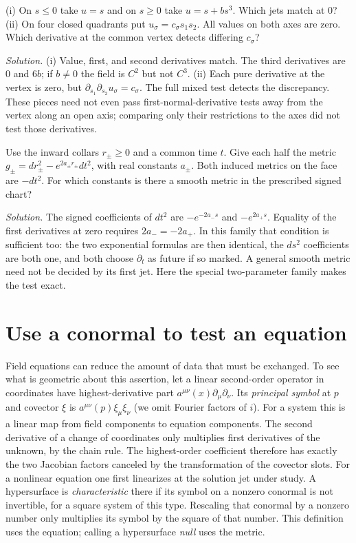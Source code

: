 \begin{exercise}
(i) On $s\leq0$ take $u=s$ and on $s\geq0$ take $u=s+bs^3$. Which jets match at $0$? (ii) On four closed quadrants put $u_\sigma=c_\sigma s_1s_2$. All values on both axes are zero. Which derivative at the common vertex detects differing $c_\sigma$?
\end{exercise}
\noindent\emph{Solution.} (i) Value, first, and second derivatives match. The third derivatives are $0$ and $6b$; if $b\ne0$ the field is $C^2$ but not $C^3$. (ii) Each pure derivative at the vertex is zero, but $\partial_{s_1}\partial_{s_2}u_\sigma=c_\sigma$. The full mixed test detects the discrepancy. These pieces need not even pass first-normal-derivative tests away from the vertex along an open axis; comparing only their restrictions to the axes did not test those derivatives.

\begin{exercise}
Use the inward collars $r_\pm\geq0$ and a common time $t$. Give each half the metric $g_\pm=dr_\pm^2-e^{2a_\pm r_\pm}dt^2$, with real constants $a_\pm$. Both induced metrics on the face are $-dt^2$. For which constants is there a smooth metric in the prescribed signed chart?
\end{exercise}
\noindent\emph{Solution.} The signed coefficients of $dt^2$ are $-e^{-2a_-s}$ and $-e^{2a_+s}$. Equality of the first derivatives at zero requires $2a_-=-2a_+$. In this family that condition is sufficient too: the two exponential formulas are then identical, the $ds^2$ coefficients are both one, and both choose $\partial_t$ as future if so marked. A general smooth metric need not be decided by its first jet. Here the special two-parameter family makes the test exact.

\section{Use a conormal to test an equation}\label{D-symbol}
Field equations can reduce the amount of data that must be exchanged. To see what is geometric about this assertion, let a linear second-order operator in coordinates have highest-derivative part $a^{\mu\nu}(x)\partial_\mu\partial_\nu$. Its \emph{principal symbol} at $p$ and covector $\xi$ is $a^{\mu\nu}(p)\xi_\mu\xi_\nu$ (we omit Fourier factors of $i$). For a system this is a linear map from field components to equation components. The second derivative of a change of coordinates only multiplies first derivatives of the unknown, by the chain rule. The highest-order coefficient therefore has exactly the two Jacobian factors canceled by the transformation of the covector slots. For a nonlinear equation one first linearizes at the solution jet under study. A hypersurface is \emph{characteristic} there if its symbol on a nonzero conormal is not invertible, for a square system of this type. Rescaling that conormal by a nonzero number only multiplies its symbol by the square of that number. This definition uses the equation; calling a hypersurface \emph{null} uses the metric.

